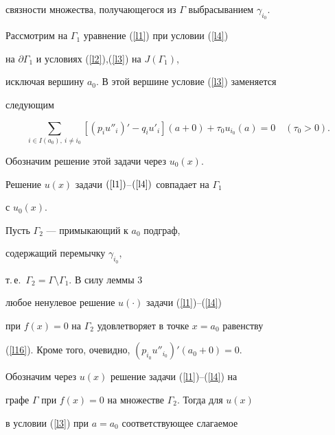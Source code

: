 {{{{{{{связности множества, получающегося из $\Gamma$ выбрасыванием $\gamma_{i_0}$.





Рассмотрим на $\Gamma_1$ уравнение (\ref{l1}) при условии (\ref{l4})


на $\partial \Gamma_1$ и условиях (\ref{l2}),(\ref{l3}) на $J(\Gamma_1)$,


исключая вершину $a_0$. В этой вершине условие (\ref{l3}) заменяется


следующим


\begin{equation}


\label{l17}


\sum_{i \in I(a_0),\ i \ne i_0}[(p_iu''_{i})'


-q_iu'_{i}](a+0)+\tau_0u_{i_0}(a)=0\quad (\tau_0 >0).


\end{equation}


Обозначим решение этой задачи через $u_0(x)$.





\begin{thm}


Решение $u(x)$ задачи $(\ref{l1})$--$(\ref{l4})$ совпадает на $\Gamma_1$


с $u_0(x)$.


\end{thm}





\begin{pf} Пусть $\Gamma_2$ --- примыкающий к $a_0$ подграф,


содержащий перемычку $\gamma_{i_0}$,


т.\,е.~$\Gamma_2=\Gamma\setminus\Gamma_1$. В силу леммы 3


любое ненулевое решение $u(\cdot)$ задачи (\ref{l1})--(\ref{l4})


при $f(x)=0$ на $\Gamma_2$ удовлетворяет в точке $x=a_0$ равенству


(\ref{l16}). Кроме того, очевидно, $(p_{i_0}u''_{i_0})'(a_0+0)=0$.


Обозначим через $u(x)$ решение задачи (\ref{l1})--(\ref{l4}) на


графе $\Gamma$ при $f(x)=0$ на множестве $\Gamma_2$. Тогда для $u(x)$


в условии (\ref{l3}) при $a=a_0$ соответствующее слагаемое



\end{pf}}}}}}}}
